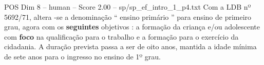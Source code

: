 \begin{textsample}{POS Dim 8 – human – Score 2.00 – sp/sp\_ef\_intro\_1\_p4.txt}  \label{ex:f8_pos_013}
Com a LDB nº 5692/71, altera -se a denominação “ ensino primário ” para ensino de primeiro grau, agora com os \textbf{seguintes} objetivos : a formação da criança e/ou adolescente com \textbf{foco} na qualificação para o trabalho e a formação para o exercício da cidadania.
A duração prevista passa a ser de oito anos, mantida a idade mínima de sete anos para o ingresso no ensino de 1º grau.

\end{textsample}
